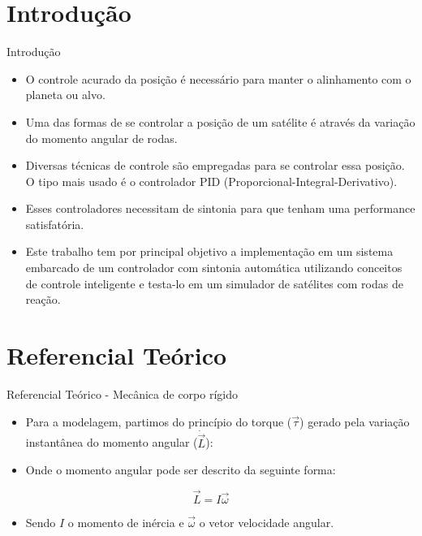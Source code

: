 \documentclass{beamer}
\begin{document}
\section{Introdução}
\begin{frame}{Introdução}
	\begin{itemize}
		\justifying
		\item O controle acurado da posição é
necessário para manter o alinhamento com o planeta ou alvo. 
		\item Uma das formas de se controlar a posição de um satélite é através da variação do momento angular de rodas.
		\item Diversas técnicas de controle são empregadas para se controlar essa posição. O tipo mais usado é o controlador PID  (Proporcional-Integral-Derivativo).
		\item Esses controladores necessitam de sintonia para que tenham uma performance satisfatória.
		\item Este trabalho tem por principal objetivo a implementação em um sistema embarcado
de um controlador com sintonia automática utilizando conceitos de controle inteligente e testa-lo em um simulador de satélites com rodas de reação.
    \end{itemize}
\end{frame}

\section{Referencial Teórico}
\begin{frame}{Referencial Teórico - Mecânica de corpo rígido}
	\begin{itemize}
		\justifying
		\item Para a modelagem, partimos do princípio do torque ($\vec{\tau}$) gerado pela variação instantânea do momento angular ($\dot{\vec{L}}$):
    \end{itemize}

	\begin{itemize}
		\justifying
		\item Onde o momento angular pode ser descrito da seguinte forma:
    \end{itemize}

	\begin{equation}\label{eq:iomega}
		\vec{L}=I\vec{\omega}
	\end{equation}

	\begin{itemize}
		\justifying
		\item Sendo $I$ o momento de inércia e $\vec{\omega}$ o vetor velocidade angular.
    \end{itemize}


\end{frame}
\end{document}
